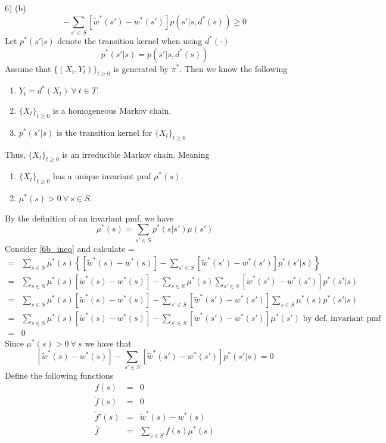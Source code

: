 \documentclass[11pt,a4paper]{article}
\begin{document}
\begin{answer}{6) (b)}
\begin{equation}
    [\tilde{w}^*(s)-w^*(s)]-\sum_{s'\in S}[\tilde{w}^*(s')-w^*(s')]p(s'|s,d^*(s))\geq0
    \label{6b_ineq}
  \end{equation}
  Let $p^*(s'|s)$ denote the transition kernel when using $d^*(\cdot)$
  \[ p^*(s'|s)=p(s'|s,d^*(s)) \]
  Assume that $\{(X_t,Y_t)\}_{t\geq0}$ is generated by $\pi^*$. Then we know the following
  \begin{enumerate}
    \item $Y_t=d^*(X_t)\ \forall\ t\in T$.
    \item $\{X_t\}_{t\geq0}$ is a homogeneous Markov chain.
    \item $p^*(s'|s)$ is the transition kernel for $\{X_t\}_{t\geq0}$
  \end{enumerate}
  Thus, $\{X_t\}_{t\geq0}$ is an irreducible Markov chain. Meaning
  \begin{enumerate}
    \item $\{X_t\}_{t\geq0}$ has a unique invariant pmf $\mu^*(s)$.
    \item $\mu^*(s)>0\ \forall\ s\in S$.
  \end{enumerate}
  By the definition of an invariant pmf, we have
  \[ \mu^*(s)=\sum_{s'\in S}p^*(s|s')\mu(s') \]
  Consider \ref{6b_ineq} and calculate
  \everymath={\displaystyle}
  \[\begin{array}{rl}
    =&\sum_{s\in S}\mu^*(s)\left\{[\tilde{w}^*(s)-w^*(s)]-\sum_{s'\in S}[\tilde{w}^*(s')-w^*(s')]p^*(s'|s)\right\}\\
    =&\sum_{s\in S}\mu^*(s)[\tilde{w}^*(s)-w^*(s)]-\sum_{s\in S}\mu^*(s)\sum_{s'\in S}[\tilde{w}^*(s')-w^*(s')]p^*(s'|s)\\
    =&\sum_{s\in S}\mu^*(s)[\tilde{w}^*(s)-w^*(s)]-\sum_{s'\in S}[\tilde{w}^*(s')-w^*(s')]\sum_{s\in S}\mu^*(s)p^*(s'|s)\\
    =&\sum_{s\in S}\mu^*(s)[\tilde{w}^*(s)-w^*(s)]-\sum_{s'\in S}[\tilde{w}^*(s')-w^*(s')]\mu^*(s')\text{ by def. invariant pmf}\\
    =&0
  \end{array}\]
  Since $\mu^*(s)>0\ \forall\ s$ we have that
  \[ [\tilde{w}^*(s)-w^*(s)]-\sum_{s'\in S}[\tilde{w}^*(s')-w^*(s')]p^*(s'|s)=0 \]
  Define the following functions
  \[\begin{array}{rcl}
    f(s)&=&0\\
    \check{f}(s)&=&0\\
    \check{f}'(s)&=&\tilde{w}^*(s)-w^*(s)\\
    \bar{f}&=&\sum_{s\in S}f(s)\mu^*(s)
  \end{array}\]

\end{answer}
\end{document}

